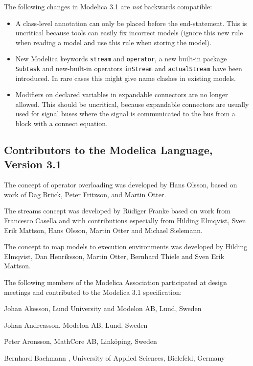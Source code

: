 The following changes in Modelica 3.1 are \emph{not} backwards compatible:
\begin{itemize}
\item
  A class-level annotation can only be placed before the end-statement.
  This is uncritical because tools can easily fix incorrect models
  (ignore this new rule when reading a model and use this rule when
  storing the model).
\item
  New Modelica keywords \lstinline!stream! and \lstinline!operator!, a new built-in
  package \lstinline!Subtask! and new-built-in operators \lstinline!inStream! and
  \lstinline!actualStream! have been introduced. In rare cases this might give
  name clashes in existing models.
\item
  Modifiers on declared variables in expandable connectors are no longer
  allowed. This should be uncritical, because expandable connectors are
  usually used for signal buses where the signal is communicated to the
  bus from a block with a connect equation.
\end{itemize}

\subsection{Contributors to the Modelica Language, Version 3.1}\label{contributors-to-the-modelica-language-version-3-1}

The concept of operator overloading was developed by Hans Olsson, based
on work of Dag Brück, Peter Fritzson, and Martin Otter.

The streams concept was developed by Rüdiger Franke based on work from
Francesco Casella and with contributions especially from Hilding
Elmqvist, Sven Erik Mattson, Hans Olsson, Martin Otter and Michael
Sielemann.

The concept to map models to execution environments was developed by
Hilding Elmqvist, Dan Henriksson, Martin Otter, Bernhard Thiele and Sven
Erik Mattson.

The following members of the Modelica Association participated at design
meetings and contributed to the Modelica 3.1 specification:

Johan Akesson, Lund University and Modelon AB, Lund, Sweden

Johan Andreasson, Modelon AB, Lund, Sweden

Peter Aronsson, MathCore AB, Linköping, Sweden

Bernhard Bachmann , University of Applied Sciences, Bielefeld, Germany

